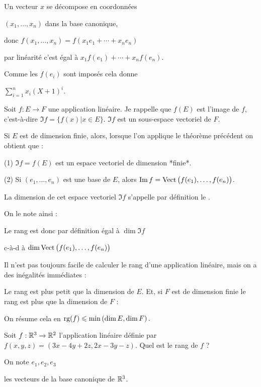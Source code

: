 \change
Un vecteur $x$ se décompose en coordonnées 

$(x_1,\ldots,x_n)$ dans la base canonique,

donc $f(x_1,\ldots,x_n)= f(x_1e_1+\cdots +x_n e_n)$ 

\change
par linéarité c'est égal à $ x_1f(e_1)+\cdots +x_nf(e_n)$.

\change
Comme les $f(e_i)$ sont imposés cela donne 

$\sum_{i=1}^n x_i(X+1)^i.$



\diapo


Soit $f : E \to F$ une application linéaire. Je rappelle que 
$f(E)$ est l'image de $f$, c'est-à-dire $\Im f = \big\{ f(x) | x \in E \big\}$. 
$\Im f$ est un sous-espace vectoriel de $F$.

\change
Si $E$ est de dimension finie, alors, lorsque l'on applique le théorème précédent on obtient que :


(1) $\Im f = f(E)$ est un espace vectoriel de dimension *finie*.

\change
(2) Si $(e_1,\ldots,e_n)$ est une base de $E$, alors
  $\mathop{\text{Im}}\nolimits f = \mathop{\text{Vect}}\nolimits \big( f(e_1),\ldots,f(e_n) \big)$.
  

La dimension de cet espace vectoriel $\Im f$ s'appelle par définition
le .

\change
On le note ainsi :

Le rang est donc par définition égal à $\dim \Im f$ 

c-à-d à  $ \dim \mathop{\text{Vect}}\nolimits \big( f(e_1),\ldots,f(e_n) \big)$

\change
Il n'est pas toujours facile de calculer le rang d'une application linéaire, mais on a 
des inégalités immédiates :


Le rang est plus petit que la dimension de $E$. Et, si $F$ est de dimension finie 
le rang est plus que la dimension de $F$ :

On résume cela en $\mathop{\text{rg}}\nolimits(f) \leqslant \min \left ( \dim E, \dim F \right).$

\diapo

Soit $f : \mathbb{R}^3 \to \mathbb{R}^2$ l'application linéaire définie
par $f(x,y,z) = (3x-4y+2z,2x-3y-z)$. Quel est le rang de $f$ ?

\change
On note $e_1,e_2,e_3$

\change
les vecteurs de la base canonique de $\mathbb{R}^3$. 

